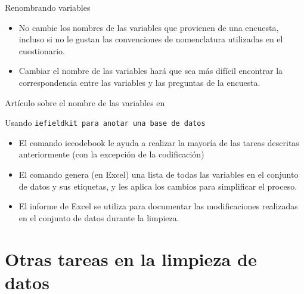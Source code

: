 \documentclass[10pt, aspectratio=169, compress]{beamer}
\begin{document}
\begin{frame}[t]{Renombrando variables}
	\begin{itemize}
		\item No cambie los nombres de las variables que provienen de una encuesta, incluso si no le gustan las convenciones de nomenclatura utilizadas en el cuestionario.
		\item Cambiar el nombre de las variables hará que sea más difícil encontrar la correspondencia entre las variables y las preguntas de la encuesta.
	\end{itemize}
	Artículo sobre el nombre de las variables en \href{https://medium.com/@janschenk/variable-names-in-survey-research-a18429d2d4d8}{\color{blue}{Medium}}
\end{frame}
\begin{frame}[t]{Usando \texttt{iefieldkit para anotar una base de datos}}
	\begin{itemize}
		\item El comando iecodebook le ayuda a realizar la mayoría de las tareas descritas anteriormente (con la excepción de la codificación)
		\item El comando genera (en Excel) una lista de todas las variables en el conjunto de datos y sus etiquetas, y les aplica los cambios para simplificar el proceso.
		\item El informe de Excel se utiliza para documentar las modificaciones realizadas en el conjunto de datos durante la limpieza.
	\end{itemize}	
\end{frame}
\section{Otras tareas en la limpieza de datos}
\end{document}
